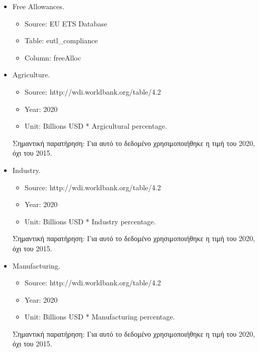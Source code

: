 \documentclass[a4paper,twoside,10pt]{article}
\begin{document}
\begin{itemize}
		\item Free Allowances.
		\begin{itemize}
			\item Source: EU ETS Database
			\item Table: eutl\_compliance
			\item Column: freeAlloc
		\end{itemize}    
		
		\item Agriculture.
		\begin{itemize}
			\item Source: http://wdi.worldbank.org/table/4.2
			\item Year:  2020
			\item Unit: Billions USD * Argicultural percentage.
		\end{itemize}  
		Σημαντική παρατήρηση: Για αυτό το δεδομένο χρησιμοποιήθηκε η τιμή του 2020, όχι του 2015.
		
		
		\item Industry.
		\begin{itemize}
			\item Source: http://wdi.worldbank.org/table/4.2
			\item Year:  2020
			\item Unit: Billions USD * Industry percentage.
		\end{itemize}  
		Σημαντική παρατήρηση: Για αυτό το δεδομένο χρησιμοποιήθηκε η τιμή του 2020, όχι του 2015.
		
		\item Manufacturing.
		\begin{itemize}
			\item Source: http://wdi.worldbank.org/table/4.2
			\item Year:  2020
			\item Unit: Billions USD * Manufacturing percentage.
		\end{itemize} 
		Σημαντική παρατήρηση: Για αυτό το δεδομένο χρησιμοποιήθηκε η τιμή του 2020, όχι του 2015.
	\end{itemize}
	
\end{document}
